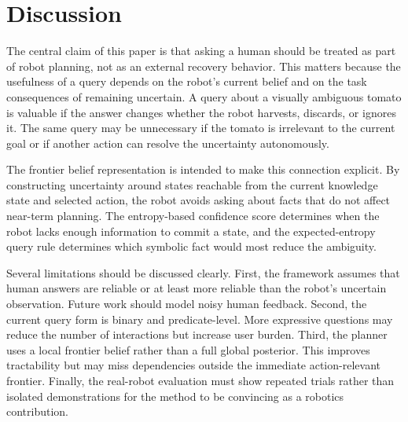 \section{Discussion}
\label{sec:discussion}

The central claim of this paper is that asking a human should be treated as part of robot planning, not as an external recovery behavior. This matters because the usefulness of a query depends on the robot's current belief and on the task consequences of remaining uncertain. A query about a visually ambiguous tomato is valuable if the answer changes whether the robot harvests, discards, or ignores it. The same query may be unnecessary if the tomato is irrelevant to the current goal or if another action can resolve the uncertainty autonomously.

The frontier belief representation is intended to make this connection explicit. By constructing uncertainty around states reachable from the current knowledge state and selected action, the robot avoids asking about facts that do not affect near-term planning. The entropy-based confidence score determines when the robot lacks enough information to commit a state, and the expected-entropy query rule determines which symbolic fact would most reduce the ambiguity.

Several limitations should be discussed clearly. First, the framework assumes that human answers are reliable or at least more reliable than the robot's uncertain observation. Future work should model noisy human feedback. Second, the current query form is binary and predicate-level. More expressive questions may reduce the number of interactions but increase user burden. Third, the planner uses a local frontier belief rather than a full global posterior. This improves tractability but may miss dependencies outside the immediate action-relevant frontier. Finally, the real-robot evaluation must show repeated trials rather than isolated demonstrations for the method to be convincing as a robotics contribution.
